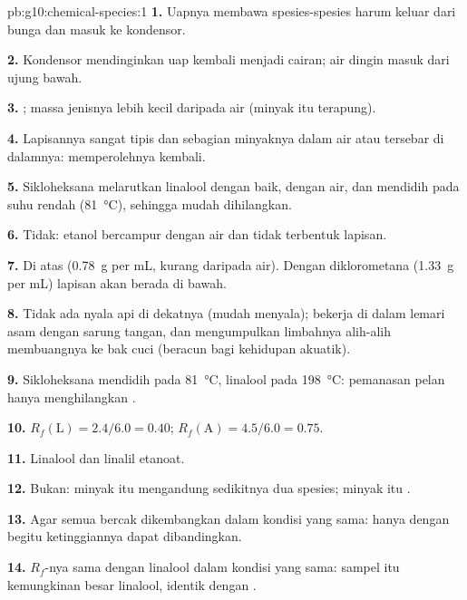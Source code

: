 \begin{solution}{pb:g10:chemical-species:1}
\textbf{1.} Uapnya membawa spesies-spesies harum keluar dari bunga dan
masuk ke kondensor.

\textbf{2.} Kondensor mendinginkan uap kembali menjadi cairan; air
dingin masuk dari ujung bawah.

\textbf{3.} ; massa jenisnya lebih kecil daripada
air (minyak itu terapung).

\textbf{4.} Lapisannya sangat tipis dan sebagian minyaknya  dalam
air atau tersebar di dalamnya:  memperolehnya kembali.

\textbf{5.} Sikloheksana melarutkan linalool dengan baik,  dengan air, dan mendidih pada suhu rendah
(\qty{81}{\celsius}), sehingga mudah dihilangkan.

\textbf{6.} Tidak: etanol bercampur dengan air dan tidak terbentuk
lapisan.

\textbf{7.} Di atas (\qty{0.78}{g} per mL, kurang daripada air). Dengan
diklorometana (\qty{1.33}{g} per mL) lapisan  akan berada di
bawah.

\textbf{8.} Tidak ada nyala api di dekatnya (mudah menyala); bekerja di
dalam lemari asam dengan sarung tangan, dan mengumpulkan limbahnya
alih-alih membuangnya ke bak cuci (beracun bagi kehidupan akuatik).

\textbf{9.} Sikloheksana mendidih pada \qty{81}{\celsius}, linalool pada
\qty{198}{\celsius}: pemanasan pelan hanya menghilangkan .

\textbf{10.} $R_f(\text{L}) = 2.4/6.0 = 0.40$; $R_f(\text{A}) = 4.5/6.0
= 0.75$.

\textbf{11.} Linalool dan linalil etanoat.

\textbf{12.} Bukan: minyak itu mengandung sedikitnya dua spesies; minyak
itu .

\textbf{13.} Agar semua bercak dikembangkan dalam kondisi yang sama:
hanya dengan begitu ketinggiannya dapat dibandingkan.

\textbf{14.} $R_f$-nya sama dengan  linalool dalam kondisi
yang sama: sampel itu kemungkinan besar linalool, identik dengan .


\end{solution}
